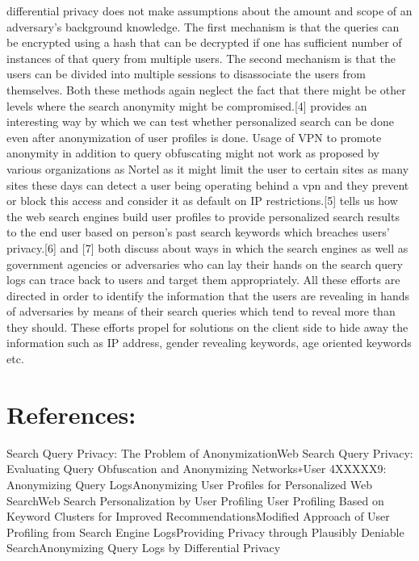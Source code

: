 \documentclass[11pt]{article}
\begin{document}
differential privacy does not make assumptions about the amount and scope of an adversary’s background knowledge. The first mechanism is that the queries can be encrypted using a hash that can be decrypted if one has sufficient number of instances of that query from multiple users. The second mechanism is that the users can be divided into multiple sessions to disassociate the users from themselves. Both these methods again neglect the fact that there might be other levels where the search anonymity might be compromised.[4] provides an interesting way by which we can test whether personalized search can be done even after anonymization of user profiles is done. Usage of VPN to promote anonymity in addition to query obfuscating might not work as proposed by various organizations as Nortel as it might limit the user to certain sites as many sites these days can detect a user being operating behind a vpn and they prevent or block this access and consider it as default on IP restrictions.[5] tells us how the web search engines build user profiles to provide personalized search results to the end user based on person’s past search keywords which breaches users’ privacy.[6] and [7] both discuss about ways in which the search engines as well as government agencies or adversaries who can lay their hands on the search query logs can trace back to users and target them appropriately. All these efforts are directed in order to identify the information that the users are revealing in hands of adversaries by means of their search queries which tend to reveal more than they should. These efforts propel for solutions on the client side to hide away the information such as IP address, gender revealing keywords, age oriented keywords etc.

\newpage
\section {References:}
\newline
[1] Search Query Privacy: The Problem of Anonymization\newline
[2] Web Search Query Privacy: Evaluating Query Obfuscation and Anonymizing Networks∗\newline
[3] User 4XXXXX9: Anonymizing Query Logs\newline
[4] Anonymizing User Profiles for Personalized Web Search\newline
[5] Web Search Personalization by User Profiling	\newline
[6] User Profiling Based on Keyword Clusters for Improved Recommendations\newline
[7] Modified Approach of User Profiling from Search Engine Logs\newline
[8] Providing Privacy through Plausibly Deniable Search\newline
[9] Anonymizing Query Logs by Differential Privacy
\end{document}
